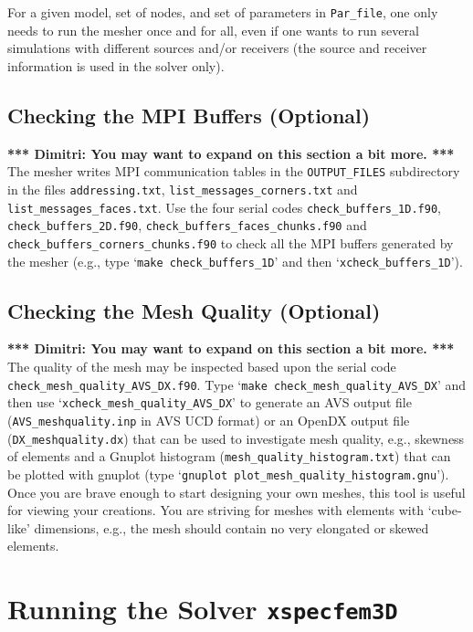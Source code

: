 \documentclass[onecolumn]{article}
\newcommand{\todimitri}[1]{\textbf{*** Dimitri: #1 ***}}
\begin{document}
For a given model, set of nodes, and set of parameters in \texttt{Par\_file},
one only needs to run the mesher once and for all, even if one wants
to run several simulations with different sources and/or receivers
(the source and receiver information is used in the solver only).

\subsection{Checking the MPI Buffers (Optional)}

\todimitri{You may want to expand on this section a bit more.}
The mesher writes MPI communication tables in the \texttt{OUTPUT\_FILES}
subdirectory in the files \texttt{addressing.txt},
\texttt{list\_messages\_corners.txt} and \texttt{list\_messages\_faces.txt}.
Use the four serial codes \texttt{check\_buffers\_1D.f90},
\texttt{check\_buffers\_2D.f90}, \texttt{check\_buffers\_faces\_chunks.f90}
and \texttt{check\_buffers\_corners\_chunks.f90} to check all the MPI buffers
generated by the mesher (e.g., type
`\texttt{make check\_buffers\_1D}' and then `\texttt{xcheck\_buffers\_1D}').

\subsection{Checking the Mesh Quality (Optional)}
\label{section:quality}

\todimitri{You may want to expand on this section a bit more.}
The quality of the mesh may be inspected based upon the serial code
\texttt{check\_mesh\_quality\_AVS\_DX.f90}.
Type `\texttt{make check\_mesh\_quality\_AVS\_DX}' and then use
`\texttt{xcheck\_mesh\_quality\_AVS\_DX}' to generate an AVS output file
(\texttt{AVS\_meshquality.inp} in AVS UCD format)
or an OpenDX output file (\texttt{DX\_meshquality.dx})
that can be used to investigate mesh quality, e.g., skewness of elements
and a Gnuplot histogram (\texttt{mesh\_quality\_histogram.txt}) that can
be plotted with gnuplot (type `\texttt{gnuplot plot\_mesh\_quality\_histogram.gnu}').
Once you are brave enough to start designing your own meshes, this tool is
useful for viewing your creations. You are striving for meshes with
elements with `cube-like' dimensions, e.g., the mesh should
contain no very elongated or skewed elements.

\section{Running the Solver \texttt{xspecfem3D}}
\label{section:solver}
\end{document}
